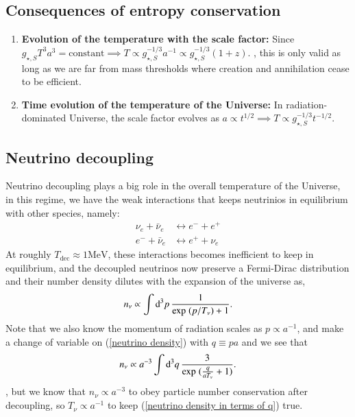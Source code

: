 \documentclass[a4paper, 12pt]{article}
\begin{document}
{{    \subsection{Consequences of entropy conservation}%
      \label{sub:Consequences of entropy conservation}
      \begin{enumerate}
        \item[\circ] \textbf{Evolution of the temperature with the
        scale factor:} Since \( g_{\star, S}^{} T^3 a^3 =
        \mathrm{constant} \implies T \propto g_{\star, S}^{-1/3} a^{-1}
        \propto g_{\star, S}^{-1/3} (1+z)  \).
      , this is only valid as long as we are far from
      mass thresholds where creation and annihilation cease to be
      efficient.
      \item[\circ] \textbf{Time evolution of the temperature of the
      Universe: } In radiation-dominated Universe, the scale factor
      evolves as \( a \propto t^{1/2} \implies T \propto
      g_{\star, S}^{-1/3} t^{-1/2}   \).
      \end{enumerate}

      \subsection{Neutrino decoupling}%
        \label{sub:Neutrino decoupling}
        Neutrino decoupling plays a big role in the overall
        temperature of the Universe, in this regime, we have the weak
        interactions that keeps neutrinios in equilibrium with
        other species, namely: 
        \begin{align}
          \label{neutrino reactions}
          \nu_e + \bar{\nu}_e &\leftrightarrow e^- + e^+ \\ 
          e^- + \bar{\nu}_e &\leftrightarrow e^+ + \nu_e
        \end{align}
        At roughly \( T_{\mathrm{dec}} \approx 1 \mathrm{MeV} \),
        these interactions becomes inefficient to keep in
        equilibrium, and the decoupled neutrinos now preserve a
        Fermi-Dirac distribution and their number density dilutes with
        the expansion of the universe as, 
        \begin{align}
          \label{neutrino density}
          n_{\nu} \propto \int \dd[3]{p} \frac{1}{\mathrm{exp}
          \hspace{0.1cm} (p/T_{\nu}) + 1}. 
        \end{align}
        Note that we also know the momentum of radiation scales as
        \( p \propto a^{-1}  \), and make a change of variable on
        (\ref{neutrino density}) with \( q \equiv pa \) and we see
        that 
        \begin{align}
          \label{neutrino density in terms of q}
          n_{\nu} \propto a^{-3} \int \dd[3]{q}
          \frac{3}{\mathrm{exp} \hspace{0.1cm} (\frac{q}{a
          T_{\nu}}+1)}. 
        \end{align}, but we know that \( n_{\nu} \propto a^{-3}  \)
        to obey particle number conservation after decoupling, so \(
        T_{\nu} \propto a^{-1} \) to keep (\ref{neutrino density in
        terms of q}) true.

}}
\end{document}
